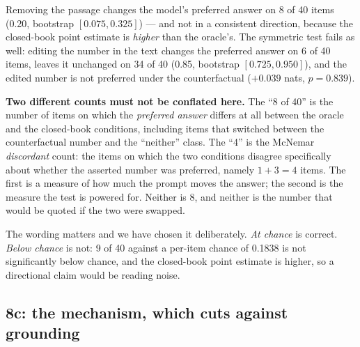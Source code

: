 \documentclass[11pt,a4paper]{article}
\begin{document}
Removing the passage changes the model's preferred answer on 8 of 40 items
(0.20, bootstrap $[0.075, 0.325]$) --- and not in a consistent direction,
because the closed-book point estimate is \emph{higher} than the oracle's. The
symmetric test fails as well: editing the number in the text changes the
preferred answer on 6 of 40 items, leaves it unchanged on 34 of 40 (0.85,
bootstrap $[0.725, 0.950]$), and the edited number is not preferred under the
counterfactual ($+0.039$ nats, $p = 0.839$).

\textbf{Two different counts must not be conflated here.} The ``8 of 40'' is
the number of items on which the \emph{preferred answer} differs at all
between the oracle and the closed-book conditions, including items that
switched between the counterfactual number and the ``neither'' class. The
``4'' is the McNemar \emph{discordant} count: the items on which the two
conditions disagree specifically about whether the asserted number was
preferred, namely $1 + 3 = 4$ items. The first is a measure of how much the
prompt moves the answer; the second is the measure the test is powered for.
Neither is 8, and neither is the number that would be quoted if the two were
swapped.

The wording matters and we have chosen it deliberately. \emph{At chance} is
correct. \emph{Below chance} is not: 9 of 40 against a per-item chance of
0.1838 is not significantly below chance, and the closed-book point estimate
is higher, so a directional claim would be reading noise. %


\subsection{8c: the mechanism, which cuts against grounding}
\label{sec:act8c}
\end{document}
